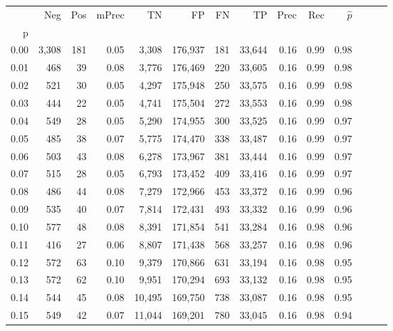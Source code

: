 \begin{tabular}{rrrrrrrrrrrrrr}
\toprule
{} &    Neg &    Pos & mPrec &       TN &       FP &      FN &      TP &  Prec &   Rec & $\hat{p}$ \\
p    &        &        &       &          &          &         &         &       &       &           \\
\midrule
0.00 &  3,308 &    181 &  0.05 &    3,308 &  176,937 &     181 &  33,644 &  0.16 &  0.99 &      0.98 \\
0.01 &    468 &     39 &  0.08 &    3,776 &  176,469 &     220 &  33,605 &  0.16 &  0.99 &      0.98 \\
0.02 &    521 &     30 &  0.05 &    4,297 &  175,948 &     250 &  33,575 &  0.16 &  0.99 &      0.98 \\
0.03 &    444 &     22 &  0.05 &    4,741 &  175,504 &     272 &  33,553 &  0.16 &  0.99 &      0.98 \\
0.04 &    549 &     28 &  0.05 &    5,290 &  174,955 &     300 &  33,525 &  0.16 &  0.99 &      0.97 \\
0.05 &    485 &     38 &  0.07 &    5,775 &  174,470 &     338 &  33,487 &  0.16 &  0.99 &      0.97 \\
0.06 &    503 &     43 &  0.08 &    6,278 &  173,967 &     381 &  33,444 &  0.16 &  0.99 &      0.97 \\
0.07 &    515 &     28 &  0.05 &    6,793 &  173,452 &     409 &  33,416 &  0.16 &  0.99 &      0.97 \\
0.08 &    486 &     44 &  0.08 &    7,279 &  172,966 &     453 &  33,372 &  0.16 &  0.99 &      0.96 \\
0.09 &    535 &     40 &  0.07 &    7,814 &  172,431 &     493 &  33,332 &  0.16 &  0.99 &      0.96 \\
0.10 &    577 &     48 &  0.08 &    8,391 &  171,854 &     541 &  33,284 &  0.16 &  0.98 &      0.96 \\
0.11 &    416 &     27 &  0.06 &    8,807 &  171,438 &     568 &  33,257 &  0.16 &  0.98 &      0.96 \\
0.12 &    572 &     63 &  0.10 &    9,379 &  170,866 &     631 &  33,194 &  0.16 &  0.98 &      0.95 \\
0.13 &    572 &     62 &  0.10 &    9,951 &  170,294 &     693 &  33,132 &  0.16 &  0.98 &      0.95 \\
0.14 &    544 &     45 &  0.08 &   10,495 &  169,750 &     738 &  33,087 &  0.16 &  0.98 &      0.95 \\
0.15 &    549 &     42 &  0.07 &   11,044 &  169,201 &     780 &  33,045 &  0.16 &  0.98 &      0.94 \\

\end{tabular}
